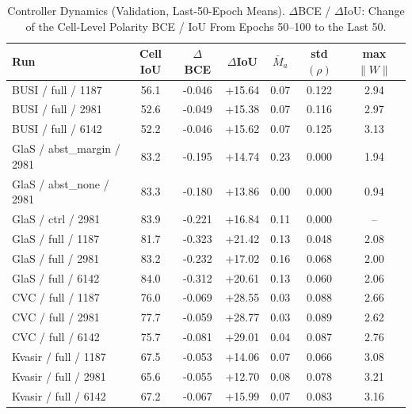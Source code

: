 \begin{table}[!t]
\caption{Controller Dynamics (Validation, Last-50-Epoch Means). $\Delta$BCE / $\Delta$IoU: Change of the Cell-Level Polarity BCE / IoU From Epochs 50--100 to the Last 50.}
\label{tab:dynamics}
\centering\scriptsize
\setlength{\tabcolsep}{3pt}
\begin{tabular}{@{}lcccccc@{}}
\toprule
Run & Cell IoU & $\Delta$BCE & $\Delta$IoU & $\bar{M}_a$ & std$(\rho)$ & max $\lVert W\rVert$ \\
\midrule
BUSI / full / 1187 & 56.1 & -0.046 & +15.64 & 0.07 & 0.122 & 2.94 \\
BUSI / full / 2981 & 52.6 & -0.049 & +15.38 & 0.07 & 0.116 & 2.97 \\
BUSI / full / 6142 & 52.2 & -0.046 & +15.62 & 0.07 & 0.125 & 3.13 \\
GlaS / abst\_margin / 2981 & 83.2 & -0.195 & +14.74 & 0.23 & 0.000 & 1.94 \\
GlaS / abst\_none / 2981 & 83.3 & -0.180 & +13.86 & 0.00 & 0.000 & 0.94 \\
GlaS / ctrl / 2981 & 83.9 & -0.221 & +16.84 & 0.11 & 0.000 & -- \\
GlaS / full / 1187 & 81.7 & -0.323 & +21.42 & 0.13 & 0.048 & 2.08 \\
GlaS / full / 2981 & 83.2 & -0.232 & +17.02 & 0.16 & 0.068 & 2.00 \\
GlaS / full / 6142 & 84.0 & -0.312 & +20.61 & 0.13 & 0.060 & 2.06 \\
CVC / full / 1187 & 76.0 & -0.069 & +28.55 & 0.03 & 0.088 & 2.66 \\
CVC / full / 2981 & 77.7 & -0.059 & +28.77 & 0.03 & 0.089 & 2.62 \\
CVC / full / 6142 & 75.7 & -0.081 & +29.01 & 0.04 & 0.087 & 2.76 \\
Kvasir / full / 1187 & 67.5 & -0.053 & +14.06 & 0.07 & 0.066 & 3.08 \\
Kvasir / full / 2981 & 65.6 & -0.055 & +12.70 & 0.08 & 0.078 & 3.21 \\
Kvasir / full / 6142 & 67.2 & -0.067 & +15.99 & 0.07 & 0.083 & 3.16 \\
\bottomrule
\end{tabular}
\end{table}
